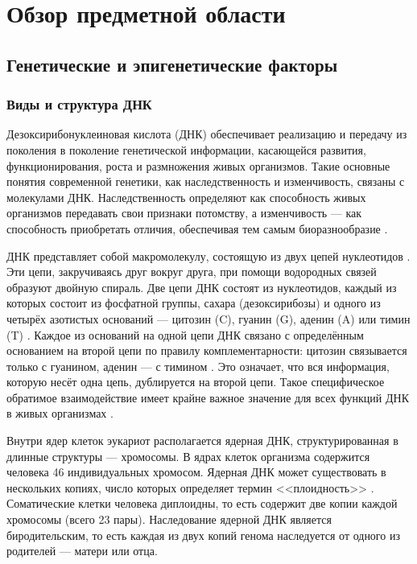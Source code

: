 \chapter{Обзор предметной области}\label{ch:ch1}

\section{Генетические и эпигенетические факторы}\label{sec:ch1/sec1}

\subsection{Виды и структура ДНК}\label{subsec:ch1/sec1/subsec1}

Дезоксирибонуклеиновая кислота (ДНК) обеспечивает реализацию и передачу из поколения в поколение генетической информации, касающейся развития, функционирования, роста и размножения живых организмов. Такие основные понятия современной генетики, как наследственность и изменчивость, связаны с молекулами ДНК. Наследственность определяют как способность живых организмов передавать свои признаки потомству, а изменчивость --- как способность приобретать отличия, обеспечивая тем самым биоразнообразие \autocite{rieger2012glossary}. 

ДНК представляет собой макромолекулу, состоящую из двух цепей нуклеотидов \autocite{brooker2004genetics,lesk2017introduction}. Эти цепи, закручиваясь друг вокруг друга, при помощи водородных связей образуют двойную спираль. Две цепи ДНК состоят из нуклеотидов, каждый из которых состоит из фосфатной группы, сахара (дезоксирибозы) и одного из четырёх азотистых оснований --- цитозин (C), гуанин (G), аденин (A) или тимин (T) \autocite{alberts2008molecular,berg2010biochemistry}. Каждое из оснований на одной цепи ДНК связано с определённым основанием на второй цепи по правилу комплементарности: цитозин связывается только с гуанином, аденин --- с тимином \autocite{tropp2012molecular}. Это означает, что вся информация, которую несёт одна цепь, дублируется на второй цепи. Такое специфическое обратимое взаимодействие имеет крайне важное значение для всех функций ДНК в живых организмах \autocite{alberts2017molecular}. 

Внутри ядер клеток эукариот располагается ядерная ДНК, структурированная в длинные структуры --- хромосомы. В ядрах клеток организма содержится человека 46 индивидуальных хромосом. Ядерная ДНК может существовать в нескольких копиях, число которых определяет термин <<плоидность>> \autocite{brown2002genomes,alberts2017molecular}. Соматические клетки человека диплоидны, то есть содержит две копии каждой хромосомы (всего 23 пары). Наследование ядерной ДНК является биродительским, то есть каждая из двух копий генома наследуется от одного из родителей --- матери или отца. 

